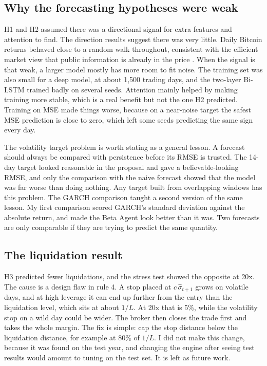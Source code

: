 \subsection{Why the forecasting hypotheses were weak}

H1 and H2 assumed there was a directional signal for extra features and attention to find. The direction results suggest there was very little. Daily Bitcoin returns behaved close to a random walk throughout, consistent with the efficient market view that public information is already in the price \cite{fama1970}. When the signal is that weak, a larger model mostly has more room to fit noise. The training set was also small for a deep model, at about 1{,}500 trading days, and the two-layer Bi-LSTM trained badly on several seeds. Attention mainly helped by making training more stable, which is a real benefit but not the one H2 predicted. Training on MSE made things worse, because on a near-noise target the safest MSE prediction is close to zero, which left some seeds predicting the same sign every day.

The volatility target problem is worth stating as a general lesson. A forecast should always be compared with persistence before its RMSE is trusted. The 14-day target looked reasonable in the proposal and gave a believable-looking RMSE, and only the comparison with the naive forecast showed that the model was far worse than doing nothing. Any target built from overlapping windows has this problem. The GARCH comparison taught a second version of the same lesson. My first comparison scored GARCH's standard deviation against the absolute return, and made the Beta Agent look better than it was. Two forecasts are only comparable if they are trying to predict the same quantity.

\subsection{The liquidation result}

H3 predicted fewer liquidations, and the stress test showed the opposite at 20x. The cause is a design flaw in rule 4. A stop placed at $c\,\hat\sigma_{t+1}$ grows on volatile days, and at high leverage it can end up further from the entry than the liquidation level, which sits at about $1/L$. At 20x that is 5\%, while the volatility stop on a wild day could be wider. The broker then closes the trade first and takes the whole margin. The fix is simple: cap the stop distance below the liquidation distance, for example at 80\% of $1/L$. I did not make this change, because it was found on the test year, and changing the engine after seeing test results would amount to tuning on the test set. It is left as future work.


